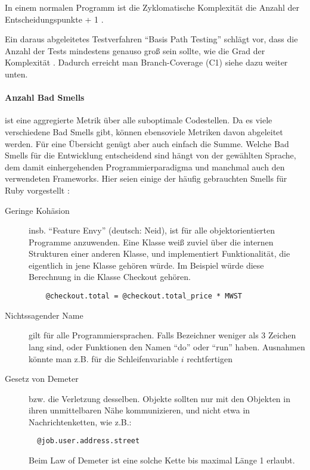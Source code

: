 In einem normalen Programm ist die Zyklomatische Komplexität die Anzahl der Entscheidungspunkte + 1 \citep[S. 314]{mccabe_complexity_1976}.

Ein daraus abgeleitetes Testverfahren "`Basis Path Testing"' schlägt vor, dass die Anzahl der Tests mindestens genauso groß sein sollte, wie die Grad der Komplexität \citep[S. 318]{mccabe_complexity_1976}. Dadurch erreicht man Branch-Coverage (C1) siehe dazu weiter unten.



\paragraph{Anzahl Bad Smells} ist eine aggregierte Metrik über alle suboptimale Codestellen. Da es viele verschiedene Bad Smells gibt, können ebensoviele Metriken davon abgeleitet werden. Für eine Übersicht genügt aber auch einfach die Summe. Welche Bad Smells für die Entwicklung entscheidend sind hängt von der gewählten Sprache, dem damit einhergehenden Programmierparadigma und manchmal auch den verwendeten Frameworks. Hier seien einige der häufig gebrauchten Smells für Ruby vorgestellt \citep{kevin_rutherford_code_2010}:

\begin{description}
 \item[Geringe Kohäsion] insb. "`Feature Envy"' (deutsch: Neid), ist für alle objektorientierten Programme anzuwenden. Eine Klasse weiß zuviel über die internen Strukturen einer anderen Klasse, und implementiert Funktionalität, die eigentlich in jene Klasse gehören würde. Im Beispiel würde diese Berechnung in die Klasse Checkout gehören.
 \begin{lstlisting}
    @checkout.total = @checkout.total_price * MWST
 \end{lstlisting}
 \item[Nichtssagender Name] gilt für alle Programmiersprachen. Falls Bezeichner weniger als 3 Zeichen lang sind, oder Funktionen den Namen "`do"' oder "`run"' haben. Ausnahmen könnte man z.B. für die Schleifenvariable $i$ rechtfertigen
 \item[Gesetz von Demeter] bzw. die Verletzung desselben. Objekte sollten nur mit den Objekten in ihren unmittelbaren Nähe kommunizieren, und nicht etwa in Nachrichtenketten, wie z.B.:
 \begin{lstlisting}
  @job.user.address.street
 \end{lstlisting}
 Beim Law of Demeter ist eine solche Kette bis maximal Länge 1 erlaubt.

 \end{description}


